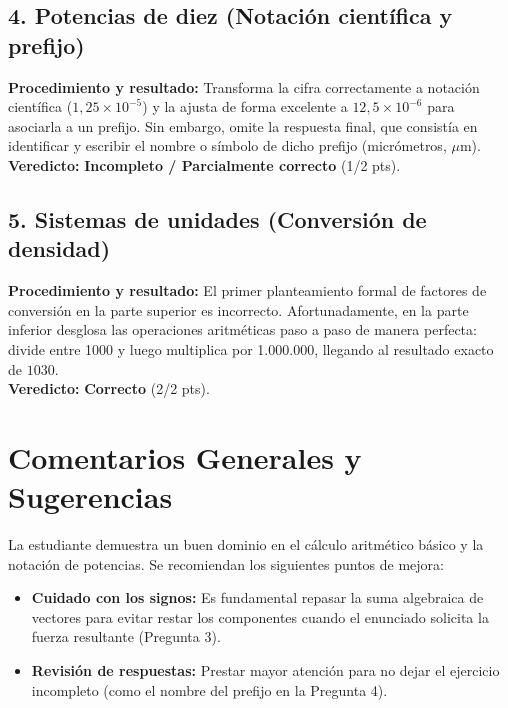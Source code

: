 \documentclass[12pt]{article}
\begin{document}
\subsection*{4. Potencias de diez (Notación científica y prefijo)}
\textbf{Procedimiento y resultado:} Transforma la cifra correctamente a notación científica ($1,25 \times 10^{-5}$) y la ajusta de forma excelente a $12,5 \times 10^{-6}$ para asociarla a un prefijo. Sin embargo, omite la respuesta final, que consistía en identificar y escribir el nombre o símbolo de dicho prefijo (micrómetros, $\mu$m). \\
\textbf{Veredicto:} \textbf{Incompleto / Parcialmente correcto} (1/2 pts).

\subsection*{5. Sistemas de unidades (Conversión de densidad)}
\textbf{Procedimiento y resultado:} El primer planteamiento formal de factores de conversión en la parte superior es incorrecto. Afortunadamente, en la parte inferior desglosa las operaciones aritméticas paso a paso de manera perfecta: divide entre 1000 y luego multiplica por 1.000.000, llegando al resultado exacto de $1030$. \\
\textbf{Veredicto:} \textbf{Correcto} (2/2 pts).

\vspace{0.5cm}
\section*{Comentarios Generales y Sugerencias}
La estudiante demuestra un buen dominio en el cálculo aritmético básico y la notación de potencias. Se recomiendan los siguientes puntos de mejora:
\begin{itemize}
    \item \textbf{Cuidado con los signos:} Es fundamental repasar la suma algebraica de vectores para evitar restar los componentes cuando el enunciado solicita la fuerza resultante (Pregunta 3).
    \item \textbf{Revisión de respuestas:} Prestar mayor atención para no dejar el ejercicio incompleto (como el nombre del prefijo en la Pregunta 4).
\end{itemize}
\end{document}
